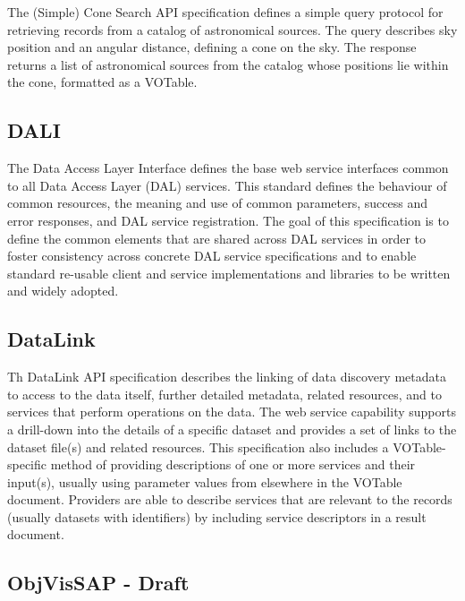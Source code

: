 \documentclass[11pt,a4paper]{ivoa}
\begin{document}
The (Simple) Cone Search API specification defines a simple query protocol for retrieving 
records from a catalog of astronomical sources. The query describes sky position and an 
angular distance, defining a cone on the sky. The response returns a list of astronomical 
sources from the catalog whose positions lie within the cone, formatted as a VOTable. 

\subsection{DALI}

The Data Access Layer Interface defines the base web service interfaces common to all Data 
Access Layer (DAL) services. This standard defines the behaviour of common resources, the 
meaning and use of common parameters, success and error responses, and DAL service 
registration. The goal of this specification is to define the common elements that are 
shared across DAL services in order to foster consistency across concrete DAL service 
specifications and to enable standard re-usable client and service implementations and 
libraries to be written and widely adopted. 

\subsection{DataLink}

Th DataLink API specification describes the linking of data discovery metadata to access to 
the data itself, further detailed metadata, related resources, and to services that perform 
operations on the data. The web service capability supports a drill-down into the details 
of a specific dataset and provides a set of links to the dataset file(s) and related resources. 
This specification also includes a VOTable-specific method of providing descriptions of one 
or more services and their input(s), usually using parameter values from elsewhere in the 
VOTable document. Providers are able to describe services that are relevant to the records 
(usually datasets with identifiers) by including service descriptors in a result document. 

\subsection{ObjVisSAP - Draft}
\end{document}
